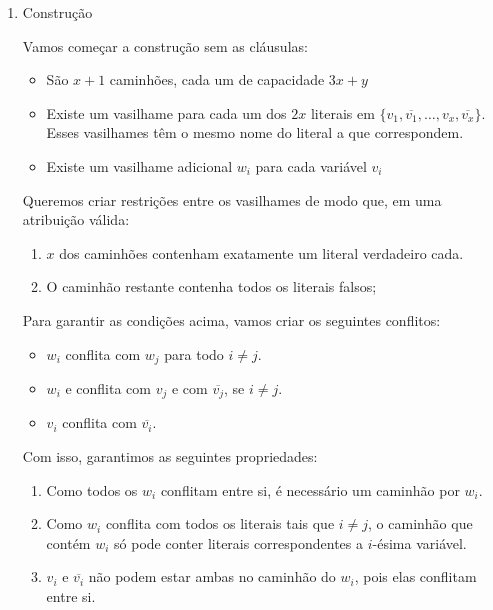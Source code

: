 \documentclass[11pt]{article}
\begin{document}
\begin{enumerate}
\item Construção
\label{sec-6-3-3-1}

Vamos começar a construção sem as cláusulas:

\begin{itemize}
\item São $x+1$ caminhões, cada um de capacidade $3x+y$

\item Existe um vasilhame para cada um dos $2x$ literais em $\{v_1,
  \overline{v_1}, \ldots, v_x, \overline{v_x}\}$. Esses vasilhames têm o
mesmo nome do literal a que correspondem.

\item Existe um vasilhame adicional $w_i$ para cada variável $v_i$
\end{itemize}

Queremos criar restrições entre os vasilhames de modo que, em uma
atribuição válida:

\begin{enumerate}
\item $x$ dos caminhões contenham exatamente um literal verdadeiro cada.
\item O caminhão restante contenha todos os literais falsos;
\end{enumerate}

Para garantir as condições acima, vamos criar os seguintes conflitos:
\begin{itemize}
\item $w_i$ conflita com $w_j$ para todo $i \neq j$.
\item $w_i$ e conflita com $v_j$ e com $\overline{v_j}$, se $i \neq j$.
\item $v_i$ conflita com $\overline{v_i}$.
\end{itemize}

Com isso, garantimos as seguintes propriedades:

\begin{enumerate}[($P_1$)]
\item Como todos os $w_i$ conflitam entre si, é necessário um
caminhão por $w_i$.

\item Como $w_i$ conflita com todos os literais tais que
$i \neq j$, o caminhão que contém $w_i$ só pode conter literais
correspondentes a $i$-ésima variável.

\item $v_i$ e $\overline{v_i}$ não
podem estar ambas no caminhão do $w_i$, pois elas conflitam entre si.


\end{enumerate}
\end{enumerate}
\end{document}
